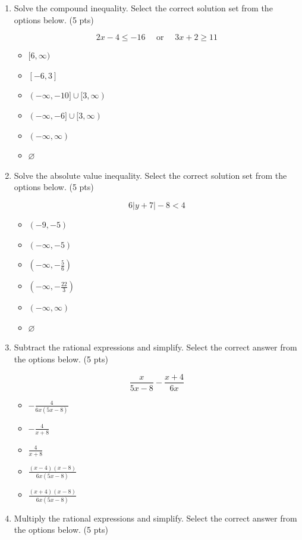 \documentclass{ximera}
\begin{document}
\begin{enumerate}
\item Solve the compound inequality. Select the correct solution set from the options below. (5 pts)

$$2 x-4 \leq-16 \quad \text { or } \quad 3 x+2 \geq 11$$

\begin{itemize}
\item $[6, \infty)$
\item $[-6,3]$
\item $(-\infty,-10] \cup[3, \infty)$
\item $(-\infty,-6] \cup[3, \infty)$
\item $(-\infty, \infty)$
\item $\varnothing$
\end{itemize}

\item Solve the absolute value inequality. Select the correct solution set from the options below. (5 pts)

$$6|y+7|-8<4$$

\begin{itemize}
\item $(-9,-5)$
\item $(-\infty,-5)$
\item $\left(-\infty,-\frac{5}{6}\right)$
\item $\left(-\infty,-\frac{22}{3}\right)$
\item $(-\infty, \infty)$
\item $\varnothing$
\end{itemize}

\item Subtract the rational expressions and simplify. Select the correct answer from the options below. (5 pts)

$$\frac{x}{5 x-8}-\frac{x+4}{6 x}$$

\begin{itemize}
\item $-\frac{4}{6 x(5 x-8)}$
\item $-\frac{4}{x+8}$
\item $\frac{4}{x+8}$
\item $\frac{(x-4)(x-8)}{6 x(5 x-8)}$
\item $\frac{(x+4)(x-8)}{6 x(5 x-8)}$
\end{itemize}

\item Multiply the rational expressions and simplify. Select the correct answer from the options below. (5 pts)


\end{enumerate}
\end{document}
